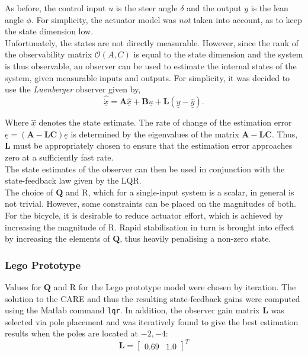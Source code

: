 As before, the control input $u$ is the steer angle $\delta$ and the output $y$ is the lean angle $\phi$. For simplicity, the actuator model was \textit{not} taken into account, as to keep the state dimension low. \\

Unfortunately, the states are not directly measurable. However, since the rank of the observability matrix $\mathcal{O}(A,C)$ is equal to the state dimension and the system is thus observable, an observer can be used to estimate the internal states of the system, given measurable inputs and outputs. For simplicity, it was decided to use the \textit{Luenberger} observer given by,
\begin{equation*}
\underline{\hat{\dot{x}}}=\mathbf{A} \underline{\hat{x}} + \mathbf{B} \underline{u} + \mathbf{L} (\underline{y} - \underline{\hat{y}}).
\end{equation*}

Where $\underline{\hat{x}}$ denotes the state estimate. The rate of change of the estimation error $\dot{\underline{e}} = (\mathbf{A - \mathbf{L C}}) \underline{e}$ is determined by the eigenvalues of the matrix $\mathbf{A - \mathbf{L C}}$. Thus, $\mathbf{L}$ must be appropriately chosen to ensure that the estimation error approaches zero at a sufficiently fast rate. \\

The state estimates of the observer can then be used in conjunction with the state-feedback law given by the LQR. \\

The choice of $\mathbf{Q}$ and R, which for a single-input system is a scalar, in general is not trivial. However, some constraints can be placed on the magnitudes of both. For the bicycle, it is desirable to reduce actuator effort, which is achieved by increasing the magnitude of R. Rapid stabilisation in turn is brought into effect by increasing the elements of $\mathbf{Q}$, thus heavily penalising a non-zero state.

\subsubsection{Lego Prototype}
Values for $\mathbf{Q}$ and R for the Lego prototype model were chosen by iteration. The solution to the CARE and thus the resulting state-feedback gains were computed using the Matlab command \texttt{lqr}. In addition, the observer gain matrix $\mathbf{L}$ was selected via pole placement and was iteratively found to give the best estimation results when the poles are located at $-2,-4$:
\begin{equation*}
\mathbf{L} = \begin{bmatrix}
0.69 & 1.0
\end{bmatrix}^T
\end{equation*}

